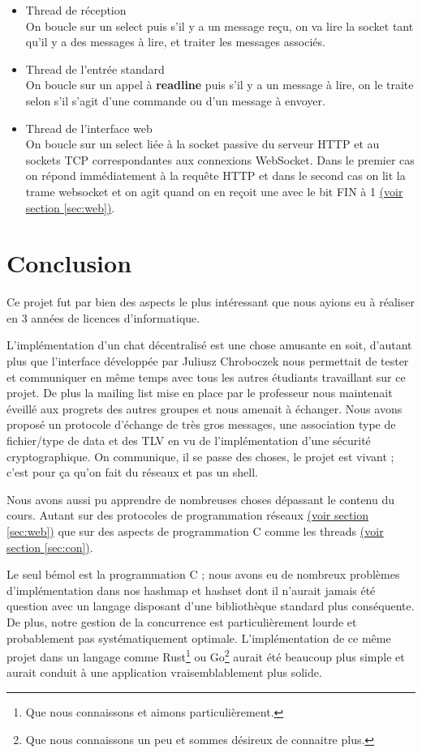 \documentclass[a4paper,10pt]{article} %
\begin{document}
\begin{itemize}
\begin{enumerate}
\end{enumerate}
\item Thread de réception \\
  On boucle sur un select puis s'il y a un message reçu, on va lire la socket tant qu'il y a des messages à lire, et traiter les messages associés.
\item Thread de l'entrée standard \\
  On boucle sur un appel à \textbf{readline} puis s'il y a un message à lire, on le traite selon s'il s'agit d'une commande ou d'un message à envoyer.
\item Thread de l'interface web \\
  On boucle sur un select liée à la socket passive du serveur \textrm{HTTP} et au sockets \textrm{TCP} correspondantes aux connexions WebSocket. Dans le premier cas on répond immédiatement à la requête \textrm{HTTP} et dans le second cas on lit la trame websocket et on agit quand on en reçoit une avec le bit \textrm{FIN} à 1 \hyperref[sec:web]{(voir section \ref{sec:web})}.
\end{itemize}

\section{Conclusion}

Ce projet fut par bien des aspects le plus intéressant que nous ayions eu à réaliser en 3 années de licences d'informatique.

L'implémentation d'un chat décentralisé est une chose amusante en soit, d'autant plus que l'interface développée par Juliusz Chroboczek nous permettait de tester et communiquer en même temps avec tous les autres étudiants travaillant sur ce projet. De plus la mailing list mise en place par le professeur nous maintenait éveillé aux progrets des autres groupes et nous amenait à échanger. Nous avons proposé un protocole d'échange de très gros messages, une association type de fichier/type de data et des TLV en vu de l'implémentation d'une sécurité cryptographique. On communique, il se passe des choses, le projet est vivant ; c'est pour ça qu'on fait du réseaux et pas un shell.

Nous avons aussi pu apprendre de nombreuses choses dépassant le contenu du cours. Autant sur des protocoles de programmation réseaux \hyperref[sec:web]{(voir section \ref{sec:web})} que sur des aspects de programmation C comme les threads \hyperref[sec:con]{(voir section \ref{sec:con})}.

Le seul bémol est la programmation C ; nous avons eu de nombreux problèmes d'implémentation dans nos hashmap et hashset dont il n'aurait jamais été question avec un langage disposant d'une bibliothèque standard plus conséquente. De plus, notre gestion de la concurrence est particulièrement lourde et probablement pas systématiquement optimale. L'implémentation de ce même projet dans un langage comme \textrm{Rust}\footnote{Que nous connaissons et aimons particulièrement.} ou \textrm{Go}\footnote{Que nous connaissons un peu et sommes désireux de connaitre plus.} aurait été beaucoup plus simple et aurait conduit à une application vraisemblablement plus solide.
\end{document}
